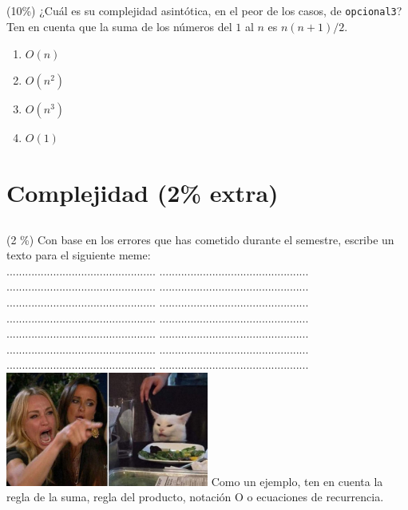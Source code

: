 \documentclass[10 pt]{article}
\begin{document}
\begin{multicols}{2}
\subsection{} (10\%) ¿Cuál es su complejidad asintótica, en el peor de los casos, de \texttt{opcional3}? Ten en cuenta que la suma de los números del $1$ al $n$ es $n(n+1)/2$.
\begin{enumerate}[label=\alph*]
	\item $O(n)$
	\item $O(n^2)$
	\item $O(n^3)$
	\item $O(1)$
\end{enumerate}

\section{Complejidad (2\% extra)}
\subsection{} (2 \%) Con base en los errores que has cometido durante el semestre,
escribe un texto para el siguiente meme:\\
................................................     ................................................\\
................................................     ................................................\\
................................................     ................................................\\
................................................     ................................................\\
................................................     ................................................\\
................................................     ................................................\\
................................................     ................................................\\
 \includegraphics[width=0.5\textwidth]{womanyellingcat.jpg}
Como un ejemplo, ten en cuenta la regla de la suma, regla del producto,
notación O o ecuaciones de recurrencia.
\end{multicols}
\end{document}
